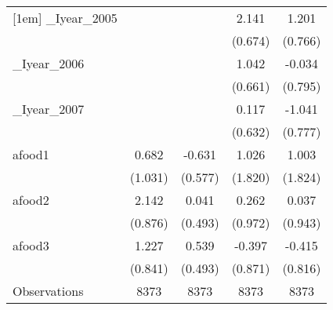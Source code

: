 {\begin{tabular}{l*{4}{c}}
[1em]
\_Iyear\_2005         &                     &                     &       2.141\sym{***}&       1.201         \\
                    &                     &                     &     (0.674)         &     (0.766)         \\
[1em]
\_Iyear\_2006         &                     &                     &       1.042         &      -0.034         \\
                    &                     &                     &     (0.661)         &     (0.795)         \\
[1em]
\_Iyear\_2007         &                     &                     &       0.117         &      -1.041         \\
                    &                     &                     &     (0.632)         &     (0.777)         \\
[1em]
afood1              &       0.682         &      -0.631         &       1.026         &       1.003         \\
                    &     (1.031)         &     (0.577)         &     (1.820)         &     (1.824)         \\
[1em]
afood2              &       2.142\sym{**} &       0.041         &       0.262         &       0.037         \\
                    &     (0.876)         &     (0.493)         &     (0.972)         &     (0.943)         \\
[1em]
afood3              &       1.227         &       0.539         &      -0.397         &      -0.415         \\
                    &     (0.841)         &     (0.493)         &     (0.871)         &     (0.816)         \\
\hline
Observations        &        8373         &        8373         &        8373         &        8373         \\
\hline\hline
\end{tabular}
}
